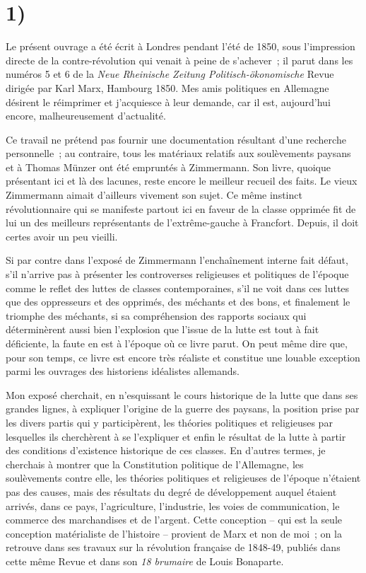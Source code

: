 \documentclass[french,twoside]{book} %
\begin{document}
\section[1)]{1)}
\noindent Le présent ouvrage a été écrit à Londres pendant l’été de 1850, sous l’impression directe de la contre-révolution qui venait à peine de s’achever ; il parut dans les numéros 5 et 6 de la \emph{Neue Rheinische Zeitung Politisch-ökonomische} Revue dirigée par Karl Marx, Hambourg 1850. Mes amis politiques en Allemagne désirent le réimprimer et j’acquiesce à leur demande, car il est, aujourd’hui encore, malheureusement d’actualité.\par
Ce travail ne prétend pas fournir une documentation résultant d’une recherche personnelle ; au contraire, tous les matériaux relatifs aux soulèvements paysans et à Thomas Münzer ont été empruntés à Zimmermann. Son livre, quoique présentant ici et là des lacunes, reste encore le meilleur recueil des faits. Le vieux Zimmermann aimait d’ailleurs vivement son sujet. Ce même instinct révolutionnaire qui se manifeste partout ici en faveur de la classe opprimée fit de lui un des meilleurs représentants de l’extrême-gauche à Francfort. Depuis, il doit certes avoir un peu vieilli.\par
Si par contre dans l’exposé de Zimmermann l’enchaînement interne fait défaut, s’il n’arrive pas à présenter les controverses religieuses et politiques de l’époque comme le reflet des luttes de classes contemporaines, s’il ne voit dans ces luttes que des oppresseurs et des opprimés, des méchants et des bons, et finalement le triomphe des méchants, si sa compréhension des rapports sociaux qui déterminèrent aussi bien l’explosion que l’issue de la lutte est tout à fait déficiente, la faute en est à l’époque où ce livre parut. On peut même dire que, pour son temps, ce livre est encore très réaliste et constitue une louable exception parmi les ouvrages des historiens idéalistes allemands.\par
Mon exposé cherchait, en n’esquissant le cours historique de la lutte que dans ses grandes lignes, à expliquer l’origine de la guerre des paysans, la position prise par les divers partis qui y participèrent, les théories politiques et religieuses par lesquelles ils cherchèrent à se l’expliquer et enfin le résultat de la lutte à partir des conditions d’existence historique de ces classes. En d’autres termes, je cherchais à montrer que la Constitution politique de l’Allemagne, les soulèvements contre elle, les théories politiques et religieuses de l’époque n’étaient pas des causes, mais des résultats du degré de développement auquel étaient arrivés, dans ce pays, l’agriculture, l’industrie, les voies de communication, le commerce des marchandises et de l’argent. Cette conception – qui est la seule conception matérialiste de l’histoire – provient de Marx et non de moi ; on la retrouve dans ses travaux sur la révolution française de 1848-49, publiés dans cette même Revue et dans son \emph{18 brumaire} de Louis Bonaparte.\par
\end{document}
